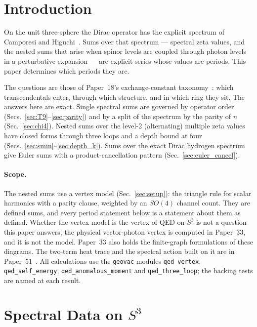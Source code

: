 \documentclass[11pt]{article}
\begin{document}
\section{Introduction}
\label{sec:introduction}

On the unit three-sphere the Dirac operator has the explicit spectrum
of Camporesi and Higuchi~\cite{camporesi1996}.  Sums over that spectrum
--- spectral zeta values, and the nested sums that arise when
spinor levels are coupled through photon levels in a perturbative
expansion --- are explicit series whose values are periods.  This paper
determines which periods they are.

The questions are those of Paper~18's exchange-constant
taxonomy~\cite{paper18}: which transcendentals enter, through which
structure, and in which ring they sit.  The answers here are exact.
Single spectral sums are governed by operator order
(Secs.~\ref{sec:T9}--\ref{sec:parity}) and by a split of the spectrum
by the parity of $n$ (Sec.~\ref{sec:chi4}).  Nested sums over the
level-2 (alternating) multiple zeta values have closed forms through
three loops and a depth bound at four (Secs.~\ref{sec:smin}--\ref{sec:depth_k}).
Sums over the exact Dirac hydrogen spectrum give Euler sums with a
product-cancellation pattern (Sec.~\ref{sec:euler_cancel}).

\paragraph{Scope.}  The nested sums use a vertex model
(Sec.~\ref{sec:setup}): the triangle rule for scalar harmonics with a
parity clause, weighted by an $SO(4)$ channel count.  They are defined
sums, and every period statement below is a statement about them as
defined.  Whether the vertex model is the vertex of QED on $S^3$ is not
a question this paper answers; the physical vector-photon vertex is
computed in Paper~33, and it is not the model.  Paper~33 also holds the
finite-graph formulations of these diagrams.  The two-term heat trace
and the spectral action built on it are in Paper~51~\cite{paper51}.
All calculations use the \texttt{geovac} modules
\texttt{qed\_vertex}, \texttt{qed\_self\_energy},
\texttt{qed\_anomalous\_moment} and \texttt{qed\_three\_loop}; the
backing tests are named at each result.

\section{Spectral Data on $S^3$}
\label{sec:spectra}
\end{document}
